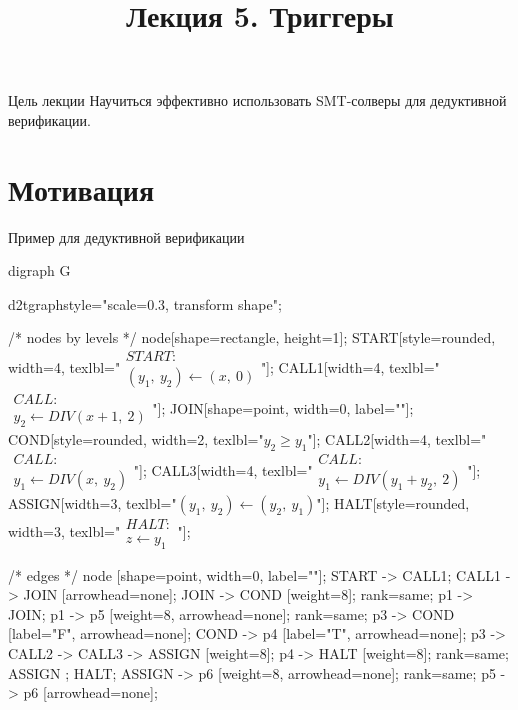 \documentclass[hyperref={unicode=true}]{beamer}
\title{Лекция 5. Триггеры}
\author{}
\date{}
\begin{document}
	\begin{frame}{}
		\titlepage
	\end{frame}

    \begin{frame}{Цель лекции}
    Научиться эффективно использовать SMT-солверы
    для дедуктивной верификации.
    \end{frame}

    \section{Мотивация}

	\begin{frame}[fragile]{Пример для дедуктивной верификации}
    \vspace*{-4mm}
    \begin{multicols}{2}

	\huge
	\begin{dot2tex}[options=-traw]
	digraph G{
		d2tgraphstyle="scale=0.3, transform shape";

		/* nodes by levels */
		node[shape=rectangle, height=1];
		START[style=rounded, width=4, texlbl="$\begin{matrix}START:\\(y_1,~y_2) \leftarrow (x,~0)\end{matrix}$"];
        CALL1[width=4, texlbl="$\begin{matrix}CALL:\\y_2 \leftarrow DIV(x + 1,~2)\end{matrix}$"];
		JOIN[shape=point, width=0, label=""];
        COND[style=rounded, width=2, texlbl="$y_2 \geq y_1$"];
        CALL2[width=4, texlbl="$\begin{matrix}CALL:\\y_1 \leftarrow DIV(x,~y_2)\end{matrix}$"];
        CALL3[width=4, texlbl="$\begin{matrix}CALL:\\y_1 \leftarrow DIV(y_1 + y_2,~2)\end{matrix}$"];
		ASSIGN[width=3, texlbl="$(y_1,~y_2) \leftarrow (y_2,~y_1)$"];
        HALT[style=rounded, width=3, texlbl="$\begin{matrix}HALT:\\  z \leftarrow y_1\end{matrix}$"];

		/* edges */
		node [shape=point, width=0, label=""];
        START -> CALL1;
        CALL1 -> JOIN [arrowhead=none];
        JOIN -> COND [weight=8];
		{ rank=same; p1 -> JOIN; }
		p1 -> p5 [weight=8, arrowhead=none];
		{ rank=same; p3 -> COND [label="F", arrowhead=none]; COND -> p4 [label="T", arrowhead=none]; }
		p3 -> CALL2 -> CALL3 -> ASSIGN [weight=8];
		p4 -> HALT [weight=8];
		{ rank=same; ASSIGN ; HALT; }
		ASSIGN -> p6 [weight=8, arrowhead=none];
	    { rank=same; p5 -> p6 [arrowhead=none]; }
	}
	\end{dot2tex}


\end{multicols}
\end{frame}
\end{document}
